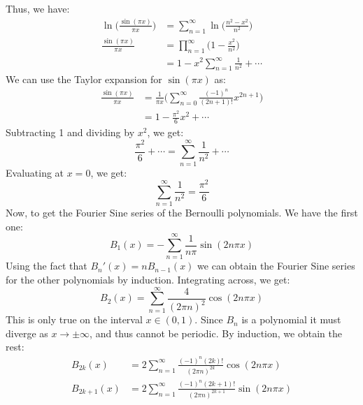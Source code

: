             Thus, we have:
            \begin{align}
                \ln\Big(\frac{\sin(\pi{x})}{\pi{x}}\Big)
                &=\sum_{n=1}^{\infty}
                    \ln\Big(\frac{n^{2}-x^{2}}{n^{2}}\Big)\\
                \frac{\sin(\pi{x})}{\pi{x}}
                &=\prod_{n=1}^{\infty}\Big(1-\frac{x^{2}}{n^{2}}\Big)\\
                &=1-x^{2}\sum_{n=1}^{\infty}\frac{1}{n^{2}}+\cdots
            \end{align}
            We can use the Taylor expansion for $\sin(\pi{x})$ as:
            \begin{align}
                \frac{\sin(\pi{x})}{\pi{x}}&=
                \frac{1}{\pi{x}}\Big(\sum_{n=0}^{\infty}
                    \frac{(-1)^{n}}{(2n+1)!}x^{2n+1}\Big)\\
                &=1-\frac{\pi^{2}}{6}x^{2}+\cdots
            \end{align}
            Subtracting 1 and dividing by $x^{2}$, we get:
            \begin{equation}
                \frac{\pi^{2}}{6}+\cdots
                =\sum_{n=1}^{\infty}\frac{1}{n^{2}}+\cdots
            \end{equation}
            Evaluating at $x=0$, we get:
            \begin{equation}
                \sum_{n=1}^{\infty}\frac{1}{n^{2}}=\frac{\pi^{2}}{6}
            \end{equation}
            Now, to get the Fourier Sine series of the Bernoulli polynomials.
            We have the first one:
            \begin{equation}
                B_{1}(x)=\minus\sum_{n=1}^{\infty}\frac{1}{n\pi}\sin(2n\pi{x})
            \end{equation}
            Using the fact that $B_{n}'(x)=nB_{n-1}(x)$ we can obtain the
            Fourier Sine series for the other polynomials by induction.
            Integrating across, we get:
            \begin{equation}
                B_{2}(x)=\sum_{n=1}^{\infty}\frac{4}{(2\pi{n})^{2}}
                    \cos(2n\pi{x})
            \end{equation}
            This is only true on the interval $x\in(0,1)$. Since 
            $B_{n}$ is a polynomial it must diverge as
            $x\rightarrow\pm\infty$, and thus cannot be periodic. By
            induction, we obtain the rest:
            \begin{align}
                B_{2k}(x)&=
                    2\sum_{n=1}^{\infty}
                        \frac{(-1)^{n}(2k)!}{(2\pi{n})^{2k}}\cos(2n\pi{x})\\
                B_{2k+1}(x)&=
                    2\sum_{n=1}^{\infty}
                        \frac{(-1)^{n}(2k+1)!}{(2\pi{n})^{2k+1}}
                            \sin(2n\pi{x})\\
            \end{align}
